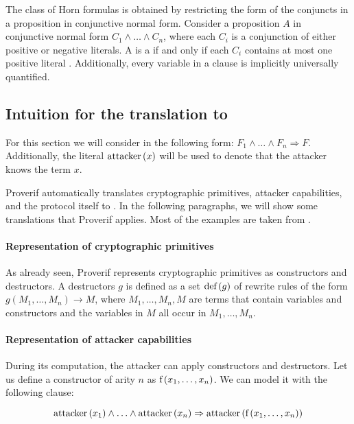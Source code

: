 The class of Horn formulas is obtained by restricting the form of the conjuncts in a proposition in conjunctive normal form. Consider a proposition $A$ in conjunctive normal form $C_1 \land \ldots \land C_n$, where each $C_i$ is a conjunction of either positive or negative literals. A is a \Hornc{} if and only if each $C_i$ contains at most one positive literal \cite{DOWLING1984267,horn_1951}. Additionally, every variable in a clause is implicitly universally quantified.


\subsection{Intuition for the translation to \Horncs{}}
For this section we will consider \Horncs{} in the following form: $F_1 \land \ldots \land F_n \Rightarrow F$.
Additionally, the literal $\mbox{attacker}\left(x\right)$ will be used to denote that the attacker knows the term $x$.

Proverif automatically translates cryptographic primitives, attacker capabilities, and the protocol itself to \Horncs{}. In the following paragraphs, we will show some translations that Proverif applies. Most of the examples are taken from \BLANC{} \cite{blanchet:hal-01110425}.

\paragraph{Representation of cryptographic primitives}
As already seen, Proverif represents cryptographic primitives as constructors and destructors. A destructors $g$ is defined as a set $\mbox{def}\left(g\right)$ of rewrite rules of the form $g\left(M_1, \ldots, M_n\right) \rightarrow M$, where $M_1, \ldots, M_n, M$ are terms that contain variables and constructors and the variables in $M$ all occur in $M_1, \ldots, M_n$.


\paragraph{Representation of attacker capabilities}
During its computation, the attacker can apply constructors and destructors. Let us define a constructor of arity $n$ as $\mbox{f}\left(x_1, \ldots, x_n\right)$. We can model it with the following clause:

\begin{equation}
    \mbox{attacker}\left(x_1\right) \land \ldots \land \mbox{attacker}\left(x_n\right) \Rightarrow \mbox{attacker}\left(\mbox{f}\left(x_1,\ldots,x_n\right)\right)
\end{equation}

